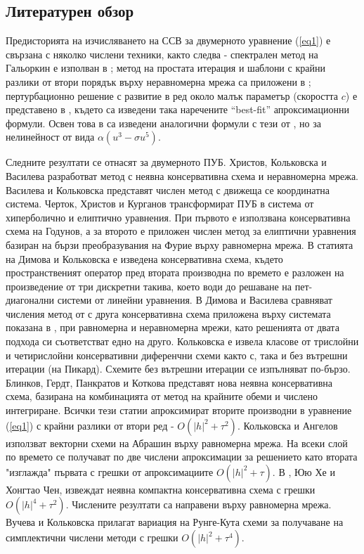 \documentclass[a4paper]{article}
\newcommand{\rf}[1]{(\ref{#1})}
\theoremstyle{remark}
\begin{document}
\begin{large}
\subsection{Литературен обзор}
Предисторията на изчисляването на ССВ за двумерното уравнение \rf{eq1} е свързана с няколко числени техники, както следва - спектрален метод на Гальоркин е изполван в \cite{ref14,ref13}; метод на простата итерация и шаблони с крайни разлики от втори порядък върху неравномерна мрежа са приложени в \cite{ref117,ref116}; пертурбационно решение с развитие в ред около малък параметър (скоростта $c$) е представено в \cite{ref15}, където са изведени така наречените ``best-fit'' апроксимационни формули. Освен това в \cite{ref159} са изведени аналогични формули с тези от \cite{ref15}, но за нелинейност от вида $\alpha(u^3 - \sigma u^5)$.

Следните резултати се отнасят за двумерното ПУБ.
Христов, Кольковска и Василева \cite{ref20} разработват метод с неявна консервативна схема и неравномерна мрежа. Василева и Кольковска \cite{ref200} представят числен метод с движеща се координатна система. Черток, Христов и Курганов \cite{ref21} трансформират ПУБ в система от хиперболично и елиптично уравнения. При първото е използвана консервативна схема на Годунов, а за второто е приложен числен метод за елиптични уравнения базиран на бързи преобразувания на Фурие върху равномерна мрежа. В статията \cite{ref241} на Димова и Кольковска е изведена консервативна схема, където пространственият оператор пред втората производна по времето е разложен на произведение от три дискретни такива, което води до решаване на пет-диагонални системи от линейни уравнения. В \cite{ref23} Димова и Василева сравняват числения метод от \cite{ref241} с друга консервативна схема приложена върху системата показана в \cite{ref21}, при равномерна и неравномерна мрежи, като решенията от двата подхода си съответстват едно на друго. Кольковска \cite{ref25, ref251, ref252} е извела класове от трислойни и четирислойни консервативни диференчни схеми както с, така и без вътрешни итерации (на Пикард). Схемите без вътрешни итерации се изпълняват по-бързо. Блинков, Гердт, Панкратов и Коткова \cite{ref253} представят нова неявна консервативна схема, базирана на комбинацията от метод на крайните обеми и числено интегриране. Всички тези статии \cite{ref20, ref21, ref241, ref23, ref25, ref251, ref252, ref253} апроксимират вторите производни в уравнение \rf{eq1} с крайни разлики от втори ред - $O(|h|^2 + \tau^2)$. Кольковска и Ангелов \cite{ref22} използват векторни схеми на Абрашин върху равномерна мрежа. На всеки слой по времето се получават по две числени апроксимации за решението като втората "изглажда" първата с грешки от апроксимациите $O(|h|^2 + \tau)$. В \cite{ref24}, Юю Хе и Хонгтао Чен, извеждат неявна компактна консервативна схема с грешки $O(|h|^4 + \tau^2)$. Числените резултати са направени върху равномерна мрежа. Вучева и Кольковска \cite{ref254} прилагат вариация на Рунге-Кута схеми за получаване на симплектични числени методи с грешки $O(|h|^2 + \tau^4)$. 


\end{large}
\end{document}
